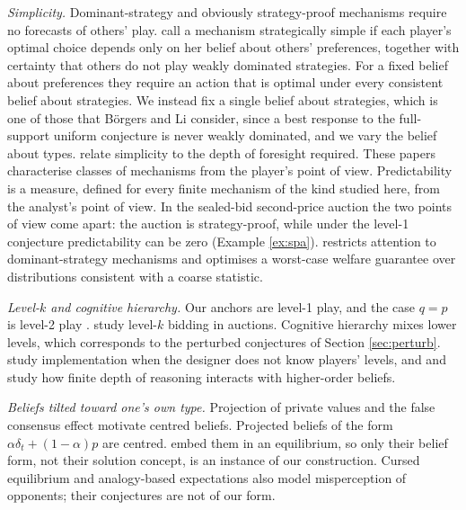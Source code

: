 \documentclass[12pt]{article}
\theoremstyle{definition}
\begin{document}
\emph{Simplicity.} Dominant-strategy and obviously strategy-proof mechanisms \citep{li2017osp} require no forecasts of others' play. \citet{borgersli2019strategically} call a mechanism strategically simple if each player's optimal choice depends only on her belief about others' preferences, together with certainty that others do not play weakly dominated strategies. For a fixed belief about preferences they require an action that is optimal under every consistent belief about strategies. We instead fix a single belief about strategies, which is one of those that Börgers and Li consider, since a best response to the full-support uniform conjecture is never weakly dominated, and we vary the belief about types. \citet{pyciatroyan2023} relate simplicity to the depth of foresight required. These papers characterise classes of mechanisms from the player's point of view. Predictability is a measure, defined for every finite mechanism of the kind studied here, from the analyst's point of view. In the sealed-bid second-price auction the two points of view come apart: the auction is strategy-proof, while under the level-1 conjecture predictability can be zero (Example \ref{ex:spa}). \citet{zhang2026gda} restricts attention to dominant-strategy mechanisms and optimises a worst-case welfare guarantee over distributions consistent with a coarse statistic.

\emph{Level-$k$ and cognitive hierarchy.} Our anchors are level-1 play, and the case $q = p$ is level-2 play \citep{nagel1995, stahl1995, costagomes2001, crawford2013jel}. \citet{crawford2007levelk} study level-$k$ bidding in auctions. Cognitive hierarchy \citep{camerer2004cognitive} mixes lower levels, which corresponds to the perturbed conjectures of Section \ref{sec:perturb}. \citet{declippel2019levelk} study implementation when the designer does not know players' levels, and \citet{strzalecki2014depth} and \citet{heifetzkets2018} study how finite depth of reasoning interacts with higher-order beliefs.

\emph{Beliefs tilted toward one's own type.} Projection of private values \citep{gpr2021projection} and the false consensus effect \citep{ross1977false} motivate centred beliefs. Projected beliefs of the form $\alpha \delta_t + (1-\alpha) p$ are centred. \citet{gpr2021projection} embed them in an equilibrium, so only their belief form, not their solution concept, is an instance of our construction. Cursed equilibrium \citep{eyster2005cursed} and analogy-based expectations \citep{jehiel2005analogy, jehielkoessler2008} also model misperception of opponents; their conjectures are not of our form.
\end{document}
